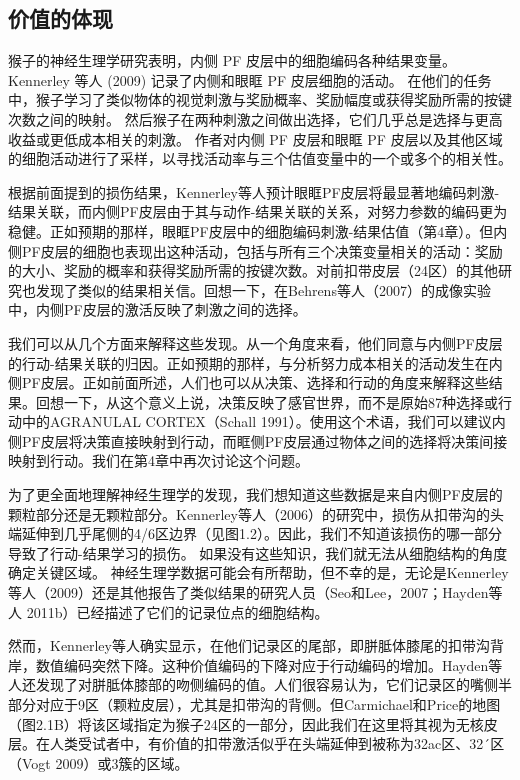 \subsection{价值的体现}
猴子的神经生理学研究表明，内侧 PF 皮层中的细胞编码各种结果变量。 Kennerley 等人 (2009) 记录了内侧和眼眶 PF 皮层细胞的活动。 在他们的任务中，猴子学习了类似物体的视觉刺激与奖励概率、奖励幅度或获得奖励所需的按键次数之间的映射。 然后猴子在两种刺激之间做出选择，它们几乎总是选择与更高收益或更低成本相关的刺激。 作者对内侧 PF 皮层和眼眶 PF 皮层以及其他区域的细胞活动进行了采样，以寻找活动率与三个估值变量中的一个或多个的相关性。\par
根据前面提到的损伤结果，Kennerley等人预计眼眶PF皮层将最显著地编码刺激-结果关联，而内侧PF皮层由于其与动作-结果关联的关系，对努力参数的编码更为稳健。正如预期的那样，眼眶PF皮层中的细胞编码刺激-结果估值（第4章）。但内侧PF皮层的细胞也表现出这种活动，包括与所有三个决策变量相关的活动：奖励的大小、奖励的概率和获得奖励所需的按键次数。对前扣带皮层（24区）的其他研究也发现了类似的结果相关信\cite{Seo&Lee 2007;Hayden&Platt 2010}。回想一下，在Behrens等人（2007）的成像实验中，内侧PF皮层的激活反映了刺激之间的选择。\par
我们可以从几个方面来解释这些发现。从一个角度来看，他们同意与内侧PF皮层的行动-结果关联的归因。正如预期的那样，与分析努力成本相关的活动发生在内侧PF皮层。正如前面所述，人们也可以从决策、选择和行动的角度来解释这些结果。回想一下，从这个意义上说，决策反映了感官世界，而不是原始87种选择或行动中的AGRANULAL CORTEX（Schall 1991）。使用这个术语，我们可以建议内侧PF皮层将决策直接映射到行动，而眶侧PF皮层通过物体之间的选择将决策间接映射到行动。我们在第4章中再次讨论这个问题。\par
为了更全面地理解神经生理学的发现，我们想知道这些数据是来自内侧PF皮层的颗粒部分还是无颗粒部分。Kennerley等人（2006）的研究中，损伤从扣带沟的头端延伸到几乎尾侧的4/6区边界（见图1.2）。因此，我们不知道该损伤的哪一部分导致了行动-结果学习的损伤。
如果没有这些知识，我们就无法从细胞结构的角度确定关键区域。
神经生理学数据可能会有所帮助，但不幸的是，无论是Kennerley等人（2009）还是其他报告了类似结果的研究人员（Seo和Lee，2007；Hayden等人
2011b）已经描述了它们的记录位点的细胞结构。\par
然而，Kennerley等人确实显示，在他们记录区的尾部，即胼胝体膝尾的扣带沟背岸，数值编码突然下降。这种价值编码的下降对应于行动编码的增加。Hayden等人还发现了对胼胝体膝部的吻侧编码的值。人们很容易认为，它们记录区的嘴侧半部分对应于9区（颗粒皮层），尤其是扣带沟的背侧。但Carmichael和Price的地图（图2.1B）将该区域指定为猴子24区的一部分，因此我们在这里将其视为无核皮层。在人类受试者中，有价值的扣带激活似乎在头端延伸到被称为32ac区\cite{Öngür et al. 2003}、32´区（Vogt 2009）或3簇\cite{Beckmann et al 2009}的区域。\par
